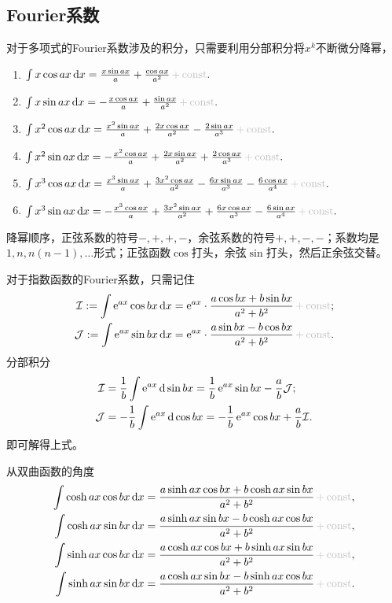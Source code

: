 \subsection{Fourier系数}
对于多项式的Fourier系数涉及的积分，只需要利用分部积分将$x^k$不断微分降幂，
\begin{enumerate}
	\item $\int x\cos ax\d x=\frac{x\sin ax}a+\frac{\cos ax}{a^2}\plusc.$ 
	\item $\int x\sin ax\d x=-\frac{x\cos ax}a+\frac{\sin ax}{a^2}\plusc.$
	\item $\int x^2\cos ax\d x=\frac{x^2\sin ax}a+\frac{2x\cos ax}{a^2}-\frac{2\sin ax}{a^3}\plusc.$
	\item $\int x^2\sin ax\d x=-\frac{x^2\cos ax}a+\frac{2x\sin ax}{a^2}+\frac{2\cos ax}{a^3}\plusc.$
	\item $\int x^3\cos ax\d x=\frac{x^3\sin ax}a+\frac{3x^2\cos ax}{a^2}-\frac{6x\sin ax}{a^3}-\frac{6\cos ax}{a^4}\plusc.$
	\item $\int x^3\sin ax\d x=-\frac{x^3\cos ax}a+\frac{3x^2\sin ax}{a^2}+\frac{6x\cos ax}{a^3}-\frac{6\sin ax}{a^4}\plusc.$
\end{enumerate}
降幂顺序，正弦系数的符号$-,+,+,-$，余弦系数的符号$+,+,-,-$；系数均是$1,n,n(n-1),\ldots$形式；正弦函数$\cos$打头，余弦$\sin$打头，然后正余弦交替。

对于指数函数的Fourier系数，只需记住
\begin{align*}
	\mathcal I:=\int\e{ax}\cos bx\d x=\e{ax}\cdot\frac{a\cos bx+b\sin bx}{a^2+b^2}\plusc;\\
	\mathcal J:=\int\e{ax}\sin bx\d x=\e{ax}\cdot\frac{a\sin bx-b\cos bx}{a^2+b^2}\plusc.
\end{align*}
\prf 分部积分
\begin{align*}
	\mathcal I&=\frac1b\int\mathop{}\!\mathrm{e}^{ax}\mathop{}\!\mathrm{d}\sin bx=\frac1b\mathop{}\!\mathrm{e}^{ax}\sin bx-\frac ab\mathcal J;\\
	\mathcal J&=-\frac1b\int\mathop{}\!\mathrm{e}^{ax}\mathop{}\!\mathrm{d}\cos bx=-\frac1b\mathop{}\!\mathrm{e}^{ax}\cos bx+\frac ab\mathcal I.
\end{align*}
即可解得上式。

从双曲函数的角度
\begin{align*}
	\int\cosh ax\cos bx\d x=\frac{a\sinh ax\cos bx+b\cosh ax\sin bx}{a^2+b^2}\plusc,\\
	\int\cosh ax\sin bx\d x=\frac{a\sinh ax\sin bx-b\cosh ax\cos bx}{a^2+b^2}\plusc,\\
	\int\sinh ax\cos bx\d x=\frac{a\cosh ax\cos bx+b\sinh ax\sin bx}{a^2+b^2}\plusc,\\
	\int\sinh ax\sin bx\d x=\frac{a\cosh ax\sin bx-b\sinh ax\cos bx}{a^2+b^2}\plusc.
\end{align*}

